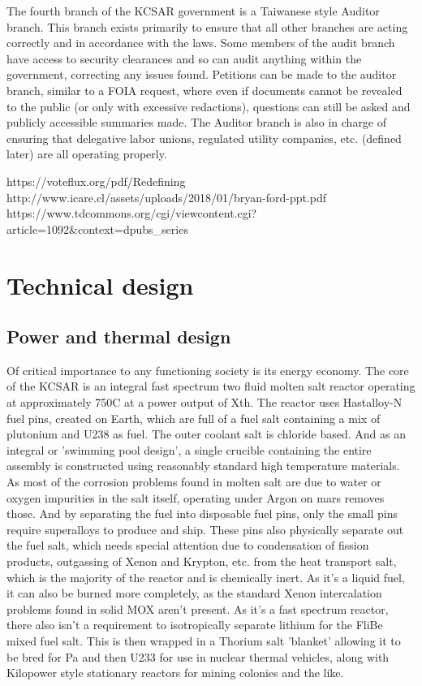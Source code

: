 \documentclass[10pt]{article}
\begin{document}
The fourth branch of the KCSAR government is a Taiwanese style Auditor branch. This branch exists primarily to ensure that all other branches are acting correctly and in accordance with the laws. Some members of the audit branch have access to security clearances and so can audit anything within the government, correcting any issues found. Petitions can be made to the auditor branch, similar to a FOIA request, where even if documents cannot be revealed to the public (or only with excessive redactions), questions can still be asked and publicly accessible summaries made. The Auditor branch is also in charge of ensuring that delegative labor unions, regulated utility companies, etc. (defined later) are all operating properly.

https://voteflux.org/pdf/Redefining%
http://www.icare.cl/assets/uploads/2018/01/bryan-ford-ppt.pdf
https://www.tdcommons.org/cgi/viewcontent.cgi?article=1092&context=dpubs_series

\section*{Technical design}
\subsection{Power and thermal design}
Of critical importance to any functioning society is its energy economy. The core of the KCSAR is an integral fast spectrum two fluid molten salt reactor operating at approximately 750C at a power output of Xth. The reactor uses Hastalloy-N fuel pins, created on Earth, which are full of a fuel salt containing a mix of plutonium and U238 as fuel. The outer coolant salt is chloride based. And as an integral or 'swimming pool design', a single crucible containing the entire assembly is constructed using reasonably standard high temperature materials. As most of the corrosion problems found in molten salt are due to water or oxygen impurities in the salt itself, operating under Argon on mars removes those. And by separating the fuel into disposable fuel pins, only the small pins require superalloys to produce and ship. These pins also physically separate out the fuel salt, which needs special attention due to condensation of fission products, outgassing of Xenon and Krypton, etc. from the heat transport salt, which is the majority of the reactor and is chemically inert. As it's a liquid fuel, it can also be burned more completely, as the standard Xenon intercalation problems found in solid MOX aren't present. As it's a fast spectrum reactor, there also isn't a requirement to isotropically separate lithium for the FliBe mixed fuel salt. This is then wrapped in a Thorium salt 'blanket' allowing it to be bred for Pa and then U233 for use in nuclear thermal vehicles, along with Kilopower style stationary reactors for mining colonies and the like.
\end{document}
